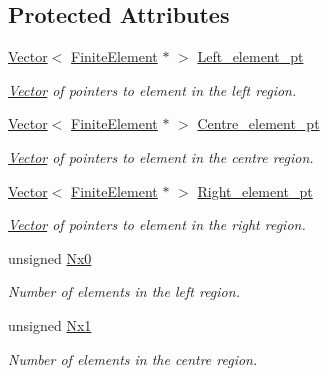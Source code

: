 \subsection*{Protected Attributes}
\begin{DoxyCompactItemize}
\item 
\hyperlink{classoomph_1_1Vector}{Vector}$<$ \hyperlink{classoomph_1_1FiniteElement}{Finite\+Element} $\ast$ $>$ \hyperlink{classoomph_1_1ChannelSpineMesh_aaa8df0751eebdab02466afa0253dedbd}{Left\+\_\+element\+\_\+pt}
\begin{DoxyCompactList}\small\item\em \hyperlink{classoomph_1_1Vector}{Vector} of pointers to element in the left region. \end{DoxyCompactList}\item 
\hyperlink{classoomph_1_1Vector}{Vector}$<$ \hyperlink{classoomph_1_1FiniteElement}{Finite\+Element} $\ast$ $>$ \hyperlink{classoomph_1_1ChannelSpineMesh_aef52a18c46a4ec6121a129789d46db3e}{Centre\+\_\+element\+\_\+pt}
\begin{DoxyCompactList}\small\item\em \hyperlink{classoomph_1_1Vector}{Vector} of pointers to element in the centre region. \end{DoxyCompactList}\item 
\hyperlink{classoomph_1_1Vector}{Vector}$<$ \hyperlink{classoomph_1_1FiniteElement}{Finite\+Element} $\ast$ $>$ \hyperlink{classoomph_1_1ChannelSpineMesh_a1cc77e7badcd1756b03aa307534011ec}{Right\+\_\+element\+\_\+pt}
\begin{DoxyCompactList}\small\item\em \hyperlink{classoomph_1_1Vector}{Vector} of pointers to element in the right region. \end{DoxyCompactList}\item 
unsigned \hyperlink{classoomph_1_1ChannelSpineMesh_a283ffaeb501cec43df629d3bf06fe3d2}{Nx0}
\begin{DoxyCompactList}\small\item\em Number of elements in the left region. \end{DoxyCompactList}\item 
unsigned \hyperlink{classoomph_1_1ChannelSpineMesh_a678cfaebcb1c7a31027188af36be9e7b}{Nx1}
\begin{DoxyCompactList}\small\item\em Number of elements in the centre region. \end{DoxyCompactList}\item 

\end{DoxyCompactItemize}
